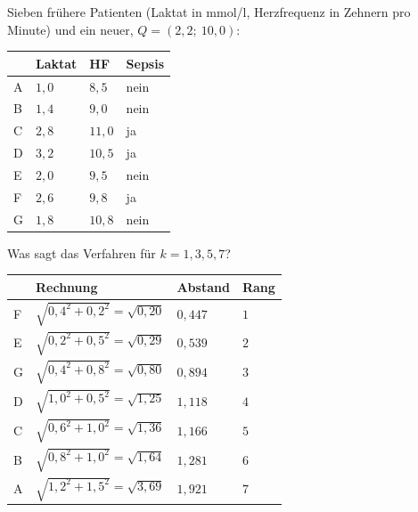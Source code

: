 \begin{aufgabe}
Sieben frühere Patienten (Laktat in mmol/l, Herzfrequenz in Zehnern pro Minute) und ein neuer, $Q = (2{,}2;\ 10{,}0)$:
\begin{center}
{\small
\renewcommand{\arraystretch}{1.44}
\begin{tabular}{@{}P{1.0cm}P{1.4cm}P{1.4cm}P{1.4cm}@{}}
\toprule
& \textbf{Laktat} & \textbf{HF} & \textbf{Sepsis}\\
\midrule
A & $1{,}0$ & $8{,}5$ & nein\\
B & $1{,}4$ & $9{,}0$ & nein\\
C & $2{,}8$ & $11{,}0$ & ja\\
D & $3{,}2$ & $10{,}5$ & ja\\
E & $2{,}0$ & $9{,}5$ & nein\\
F & $2{,}6$ & $9{,}8$ & ja\\
G & $1{,}8$ & $10{,}8$ & nein\\
\bottomrule
\end{tabular}}
\end{center}
Was sagt das Verfahren für $k = 1, 3, 5, 7$?

\loesung
{}
\begin{center}
{\small
\renewcommand{\arraystretch}{1.46}
\begin{tabular}{@{}P{1.0cm}P{3.6cm}P{1.4cm}P{1.2cm}@{}}
\toprule
& \textbf{Rechnung} & \textbf{Abstand} & \textbf{Rang}\\
\midrule
F & $\sqrt{0{,}4^{2}+0{,}2^{2}} = \sqrt{0{,}20}$ & $0{,}447$ & $1$\\
E & $\sqrt{0{,}2^{2}+0{,}5^{2}} = \sqrt{0{,}29}$ & $0{,}539$ & $2$\\
G & $\sqrt{0{,}4^{2}+0{,}8^{2}} = \sqrt{0{,}80}$ & $0{,}894$ & $3$\\
D & $\sqrt{1{,}0^{2}+0{,}5^{2}} = \sqrt{1{,}25}$ & $1{,}118$ & $4$\\
C & $\sqrt{0{,}6^{2}+1{,}0^{2}} = \sqrt{1{,}36}$ & $1{,}166$ & $5$\\
B & $\sqrt{0{,}8^{2}+1{,}0^{2}} = \sqrt{1{,}64}$ & $1{,}281$ & $6$\\
A & $\sqrt{1{,}2^{2}+1{,}5^{2}} = \sqrt{3{,}69}$ & $1{,}921$ & $7$\\
\bottomrule
\end{tabular}}
\end{center}


\end{aufgabe}
